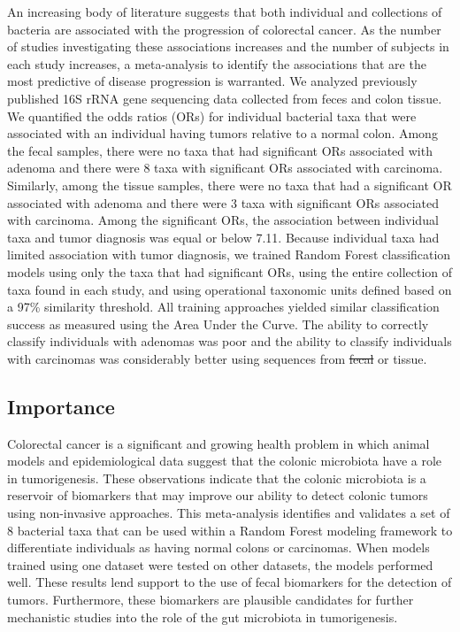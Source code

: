 \documentclass[12pt,]{article}
\providecommand{\DIFaddtex}[1]{{\protect\color{blue}\uwave{#1}}} %
\providecommand{\DIFdeltex}[1]{{\protect\color{red}\sout{#1}}}                      %
\providecommand{\DIFaddbegin}{} %
\providecommand{\DIFaddend}{} %
\providecommand{\DIFdelbegin}{} %
\providecommand{\DIFdelend}{} %
\providecommand{\DIFadd}[1]{\texorpdfstring{\DIFaddtex{#1}}{#1}} %
\providecommand{\DIFdel}[1]{\texorpdfstring{\DIFdeltex{#1}}{}} %
\begin{document}
An increasing body of literature suggests that both individual and
collections of bacteria are associated with the progression of
colorectal cancer. As the number of studies investigating these
associations increases and the number of subjects in each study
increases, a meta-analysis to identify the associations that are the
most predictive of disease progression is warranted. We analyzed
previously published 16S rRNA gene sequencing data collected from feces
and colon tissue. We quantified the odds ratios (ORs) for individual
bacterial taxa that were associated with an individual having tumors
relative to a normal colon. Among the fecal samples, there were no taxa
that had significant ORs associated with adenoma and there were 8 taxa
with significant ORs associated with carcinoma. Similarly, among the
tissue samples, there were no taxa that had a significant OR associated
with adenoma and there were 3 taxa with significant ORs associated with
carcinoma. Among the significant ORs, the association between individual
taxa and tumor diagnosis was equal or below 7.11. Because individual
taxa had limited association with tumor diagnosis, we trained Random
Forest classification models using only the taxa that had significant
ORs, using the entire collection of taxa found in each study, and using
operational taxonomic units defined based on a 97\% similarity
threshold. All training approaches yielded similar classification
success as measured using the Area Under the Curve. The ability to
correctly classify individuals with adenomas was poor and the ability to
classify individuals with carcinomas was considerably better using
sequences from \DIFdelbegin \DIFdel{fecal }\DIFdelend \DIFaddbegin \DIFadd{feces }\DIFaddend or tissue.

\newpage

\subsection{Importance}\label{importance}

Colorectal cancer is a significant and growing health problem in which
animal models and epidemiological data suggest that the colonic
microbiota have a role in tumorigenesis. These observations indicate
that the colonic microbiota is a reservoir of biomarkers that may
improve our ability to detect colonic tumors using non-invasive
approaches. This meta-analysis identifies and validates a set of 8
bacterial taxa that can be used within a Random Forest modeling
framework to differentiate individuals as having normal colons or
carcinomas. When models trained using one dataset were tested on other
datasets, the models performed well. These results lend support to the
use of fecal biomarkers for the detection of tumors. Furthermore, these
biomarkers are plausible candidates for further mechanistic studies into
the role of the gut microbiota in tumorigenesis.
\end{document}
